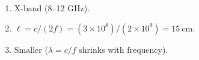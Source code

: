 \begin{enumerate}[leftmargin=1.6em,itemsep=2pt]
\item X-band (8--12 GHz).
\item $\ell = c/(2f) = (3\times10^8)/(2\times10^9) = 15\ \text{cm}$.
\item Smaller ($\lambda = c/f$ shrinks with frequency).
\end{enumerate}
